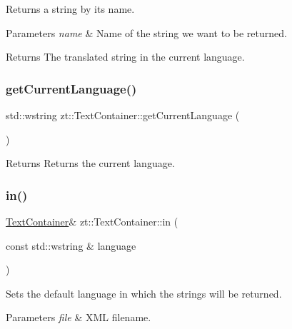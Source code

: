 Returns a string by its name. 


\begin{DoxyParams}{Parameters}
{\em name} & Name of the string we want to be returned. \\
\hline
\end{DoxyParams}
\begin{DoxyReturn}{Returns}
The translated string in the current language. 
\end{DoxyReturn}
\mbox{\label{classzt_1_1_text_container_a5db66642b418d233e16a6df1f09d7f7c}} 
\subsubsection{\texorpdfstring{get\+Current\+Language()}{getCurrentLanguage()}}
{\footnotesize\ttfamily std\+::wstring zt\+::\+Text\+Container\+::get\+Current\+Language (\begin{DoxyParamCaption}{ }\end{DoxyParamCaption})}

\begin{DoxyReturn}{Returns}
Returns the current language. 
\end{DoxyReturn}
\mbox{\label{classzt_1_1_text_container_afbf2984d70eb9e421aa65b453c1d5404}} 
\subsubsection{\texorpdfstring{in()}{in()}}
{\footnotesize\ttfamily \hyperlink{classzt_1_1_text_container}{Text\+Container}\& zt\+::\+Text\+Container\+::in (\begin{DoxyParamCaption}\item[{const std\+::wstring \&}]{language }\end{DoxyParamCaption})}



Sets the default language in which the strings will be returned. 


\begin{DoxyParams}{Parameters}
{\em file} & X\+ML filename. \\
\hline
\end{DoxyParams}
\mbox{\label{classzt_1_1_text_container_a5d210555a6b099e8ddc63c03179ac41a}} 

